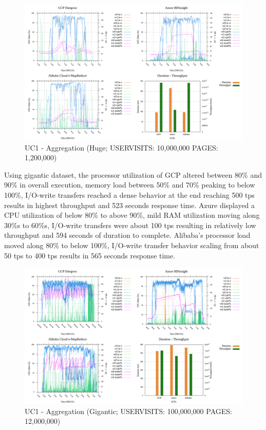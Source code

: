 \documentclass[review]{elsarticle}
\begin{document}
\begin{figure}[p]
	\caption{UC1 - Aggregation (Huge; USERVISITS: 10,000,000 PAGES: 1,200,000)}
	\label{fig:uc1-aggreg-h-cmidt}
	\includegraphics[width=\textwidth]{uc1-aggreg-h-cmidt}
	\centering
\end{figure}

Using gigantic dataset, the processor utilization of GCP altered between 80\% and 90\% in overall execution, memory load between 50\% and 70\% peaking to below 100\%, I/O-write transfers reached a dense behavior at the end reaching 500 tps results in highest throughput and 523 seconds response time. Azure displayed a CPU utilization of below 80\% to above 90\%, mild RAM utilization moving along 30\%s to 60\%s, I/O-write transfers were about 100 tps resulting in relatively low throughput and 594 seconds of duration to complete. Alibaba's processor load moved along 80\% to below 100\%, I/O-write transfer behavior scaling from about 50 tps to 400 tps results in 565 seconds response time.

\begin{figure}[p]
	\caption{UC1 - Aggregation (Gigantic; USERVISITS: 100,000,000 PAGES: 12,000,000)}
	\label{fig:uc1-aggreg-g-cmidt}
	\includegraphics[width=\textwidth]{uc1-aggreg-g-cmidt}
	\centering
\end{figure}
\end{document}
